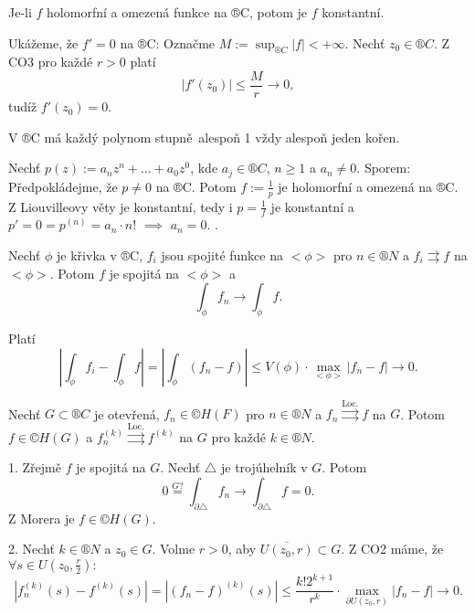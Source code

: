 \documentclass[12pt]{article}					%
\begin{document}
\begin{veta}[Liouville]
	Je-li $f$ holomorfní a omezená funkce na ®C, potom je $f$ konstantní.

	\begin{dukazin}
		Ukážeme, že $f' = 0$ na ®C: Označme $M := \sup_{®C} |f| < +∞$. Nechť $z_0 \in ®C$. Z CO3 pro každé $r > 0$ platí
		$$ |f'(z_0)| ≤ \frac{M}{r} \rightarrow 0, $$
		tudíž $f'(z_0) = 0$.
	\end{dukazin}
\end{veta}

\begin{dusledek}
	V ®C má každý polynom stupně alespoň 1 vždy alespoň jeden kořen.

	\begin{dukazin}
		Nechť $p(z) := a_n z^n + … + a_0 z^0$, kde $a_j \in ®C$, $n ≥ 1$ a $a_n ≠ 0$. Sporem: Předpokládejme, že $p ≠ 0$ na ®C. Potom $f:=\frac{1}{p}$ je holomorfní a omezená na ®C. Z Liouvilleovy věty je konstantní, tedy i $p = \frac{1}{f}$ je konstantní a $p' = 0 = p^{(n)} = a_n · n!$ $\implies$ $a_n = 0$. \lightning.
	\end{dukazin}
\end{dusledek}

\begin{lemma}
	Nechť $\phi$ je křivka v ®C, $f_i$ jsou spojité funkce na $<\phi>$ pro $n \in ®N$ a $f_i \rightrightarrows f$ na $<\phi>$. Potom $f$ je spojitá na $<\phi>$ a
	$$ \int_\phi f_n \rightarrow \int_\phi f. $$

	\begin{dukazin}
		Platí
		$$ |\int_\phi f_i - \int_\phi f| = |\int_\phi (f_n - f)| ≤ V(\phi)·\max_{<\phi>} |f_n - f| \rightarrow 0. $$
	\end{dukazin}
\end{lemma}

\begin{veta}[Weierstrass]
	Nechť $G \subset ®C$ je otevřená, $f_n \in ©H(F)$ pro $n \in ®N$ a $f_n \overset{\text{Loc.}}\rightrightarrows f$ na $G$. Potom $f \in ©H(G)$ a $f_n^{(k)} \overset{\text{Loc.}}\rightrightarrows f^{(k)}$ na $G$ pro každé $k \in ®N$.

	\begin{dukazin}
		1. Zřejmě $f$ je spojitá na $G$. Nechť $\triangle$ je trojúhelník v $G$. Potom
		$$ 0 \overset{G ?}= \int_{\partial \triangle} f_n \rightarrow \int_{\partial \triangle} f = 0. $$
		Z Morera je $f \in ©H(G)$.

		2. Nechť $k \in ®N$ a $z_0 \in G$. Volme $r > 0$, aby $\overline{U(z_0, r)} \subset G$. Z CO2 máme, že $\forall s \in U(z_0, \frac{r}{2}):$
		$$ |f_n^{(k)}(s) - f^{(k)}(s)| = |(f_n - f)^{(k)}(s)| ≤ \frac{k! 2^{k+1}}{r^k}·\max_{\partial U(z_0, r)} |f_n - f| \rightarrow 0. $$
	\end{dukazin}
\end{veta}
\end{document}

